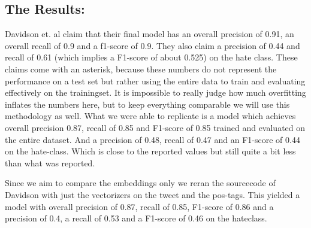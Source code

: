 \documentclass[11pt,a4paper]{article}
\begin{document}
\subsection{The Results:}
Davidson et. al claim that their final model has an overall precision of 0.91, an overall recall of 0.9 and a f1-score of 0.9.
They also claim a precision of 0.44 and recall of 0.61 (which implies a F1-score of about 0.525) on the hate class.
These claims come with an asterisk, because these numbers do not represent the performance on a test set but rather using the entire
data to train and evaluating effectively on the trainingset. 
It is impossible to really judge how much overfitting inflates the numbers here, but to keep everything comparable we will use this methodology as well.
What we were able to replicate is a model which achieves overall precision 0.87, recall of 0.85 and F1-score of 0.85 
trained and evaluated on the entire dataset.
And a precision of 0.48, recall of 0.47 and an F1-score of 0.44 on the hate-class.
Which is close to the reported values but still quite a bit less than what was reported.

\begin{table}
\caption{classification report for our reproduction of Davidson's model with features}


\label{tab:davidson_withfeat}
\end{table}

Since we aim to compare the embeddings only we reran the sourcecode of Davidson with just the vectorizers on the tweet and the pos-tags.
This yielded a model with overall precision of 0.87, recall of 0.85, F1-score of 0.86
and a precision of 0.4, a recall of 0.53 and a F1-score of 0.46 on the hateclass.
\end{document}

